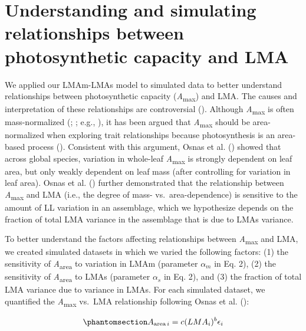\documentclass[
  12pt,
  letterpaper,
  DIV=11,
  numbers=noendperiod]{scrartcl}
\numberwithin{equation}{section}
\begin{document}
\section{Understanding and simulating relationships between
photosynthetic capacity and
LMA}\label{understanding-and-simulating-relationships-between-photosynthetic-capacity-and-lma}

We applied our LMAm-LMAs model to simulated data to better understand
relationships between photosynthetic capacity
(\emph{A}\textsubscript{max}) and LMA. The causes and interpretation of
these relationships are controversial
(). Although
\emph{A}\textsubscript{max} is often mass-normalized
(;
; e.g.,
), it has been argued
that \emph{A}\textsubscript{max} should be area-normalized when
exploring trait relationships because photosynthesis is an area-based
process (). Consistent with
this argument, Osnas et al. () showed that
across global species, variation in whole-leaf
\emph{A}\textsubscript{max} is strongly dependent on leaf area, but only
weakly dependent on leaf mass (after controlling for variation in leaf
area). Osnas et al. () further
demonstrated that the relationship between \emph{A}\textsubscript{max}
and LMA (i.e., the degree of mass- vs.~area-dependence) is sensitive to
the amount of LL variation in an assemblage, which we hypothesize
depends on the fraction of total LMA variance in the assemblage that is
due to LMAs variance.

To better understand the factors affecting relationships between
\emph{A}\textsubscript{max} and LMA, we created simulated datasets in
which we varied the following factors: (1) the sensitivity of
\emph{A}\textsubscript{area} to variation in LMAm (parameter
\(\alpha_m\) in Eq. 2), (2) the sensitivity of
\emph{A}\textsubscript{area} to LMAs (parameter \(\alpha_s\) in Eq. 2),
and (3) the fraction of total LMA variance due to variance in LMAs. For
each simulated dataset, we quantified the \emph{A}\textsubscript{max}
vs.~LMA relationship following Osnas et al.
():

\begin{equation}\phantomsection\label{eq-mass}{
A_{\mathrm{area} \, i} = c (LMA_i)^{b}\epsilon_i
}\end{equation}
\end{document}
